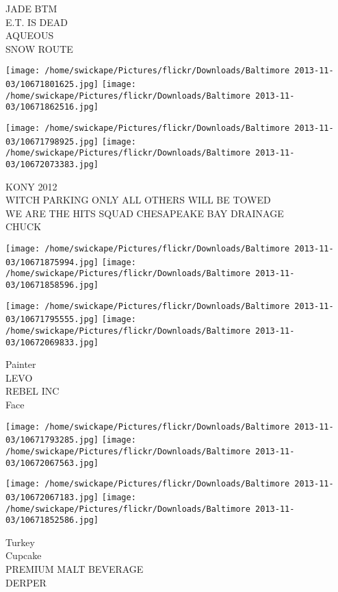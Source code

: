 \documentclass[10pt,letterpaper]{article}
\begin{document}
JADE BTM\\
E.T. IS DEAD\\
AQUEOUS\\
SNOW ROUTE\\
\pagebreak

\texttt{[image: /home/swickape/Pictures/flickr/Downloads/Baltimore 2013-11-03/10671801625.jpg]}
\texttt{[image: /home/swickape/Pictures/flickr/Downloads/Baltimore 2013-11-03/10671862516.jpg]}

\texttt{[image: /home/swickape/Pictures/flickr/Downloads/Baltimore 2013-11-03/10671798925.jpg]}
\texttt{[image: /home/swickape/Pictures/flickr/Downloads/Baltimore 2013-11-03/10672073383.jpg]}

KONY 2012\\
WITCH PARKING ONLY ALL OTHERS WILL BE TOWED\\
WE ARE THE HITS SQUAD CHESAPEAKE BAY DRAINAGE\\
CHUCK\\
\pagebreak

\texttt{[image: /home/swickape/Pictures/flickr/Downloads/Baltimore 2013-11-03/10671875994.jpg]}
\texttt{[image: /home/swickape/Pictures/flickr/Downloads/Baltimore 2013-11-03/10671858596.jpg]}

\texttt{[image: /home/swickape/Pictures/flickr/Downloads/Baltimore 2013-11-03/10671795555.jpg]}
\texttt{[image: /home/swickape/Pictures/flickr/Downloads/Baltimore 2013-11-03/10672069833.jpg]}

Painter\\
LEVO\\
REBEL INC\\
Face\\
\pagebreak

\texttt{[image: /home/swickape/Pictures/flickr/Downloads/Baltimore 2013-11-03/10671793285.jpg]}
\texttt{[image: /home/swickape/Pictures/flickr/Downloads/Baltimore 2013-11-03/10672067563.jpg]}

\texttt{[image: /home/swickape/Pictures/flickr/Downloads/Baltimore 2013-11-03/10672067183.jpg]}
\texttt{[image: /home/swickape/Pictures/flickr/Downloads/Baltimore 2013-11-03/10671852586.jpg]}

Turkey\\
Cupcake\\
PREMIUM MALT BEVERAGE\\
DERPER\\
\pagebreak
\end{document}
